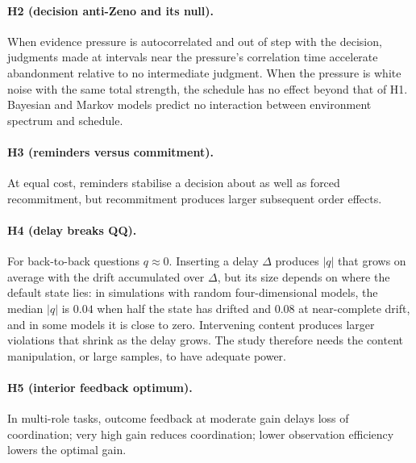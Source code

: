 \documentclass[11pt]{article}
\theoremstyle{definition}
\theoremstyle{remark}
\begin{document}
\paragraph{H2 (decision anti-Zeno and its null).} When evidence pressure is autocorrelated and out of step with the decision, judgments made at intervals near the pressure's correlation time accelerate abandonment relative to no intermediate judgment. When the pressure is white noise with the same total strength, the schedule has no effect beyond that of H1. Bayesian and Markov models predict no interaction between environment spectrum and schedule.

\paragraph{H3 (reminders versus commitment).} At equal cost, reminders stabilise a decision about as well as forced recommitment, but recommitment produces larger subsequent order effects.

\paragraph{H4 (delay breaks QQ).} For back-to-back questions $q\approx 0$. Inserting a delay $\Delta$ produces $|q|$ that grows on average with the drift accumulated over $\Delta$, but its size depends on where the default state lies: in simulations with random four-dimensional models, the median $|q|$ is $0.04$ when half the state has drifted and $0.08$ at near-complete drift, and in some models it is close to zero. Intervening content produces larger violations that shrink as the delay grows. The study therefore needs the content manipulation, or large samples, to have adequate power.

\paragraph{H5 (interior feedback optimum).} In multi-role tasks, outcome feedback at moderate gain delays loss of coordination; very high gain reduces coordination; lower observation efficiency lowers the optimal gain.
\end{document}
